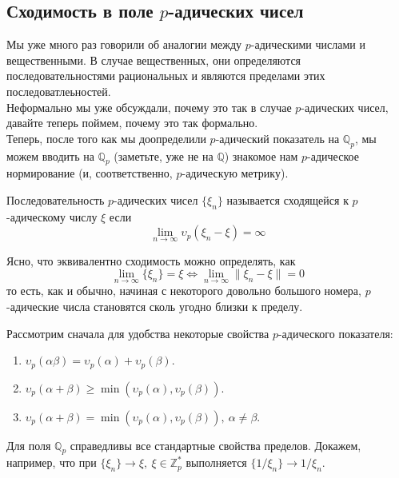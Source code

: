 \documentclass[11pt]{article}
\begin{document}
    \subsection{Сходимость в поле $p$-адических чисел}
    Мы уже много раз говорили об аналогии между $p$-адическими числами и вещественными. В случае вещественных, они определяются последовательностями
    рациональных и являются пределами этих последоватлеьностей. \\

    Неформально мы уже обсуждали, почему это так в случае $p$-адических чисел, давайте теперь поймем, почему это так формально. \\

    Теперь, после того как мы доопределили $p$-адический показатель на $\mathbb{Q}_p$, мы можем вводить на $\mathbb{Q}_p$ (заметьте, уже не на $\mathbb{Q}$) знакомое
    нам  $p$-адическое нормирование (и, соответственно, $p$-адическую метрику).

    \begin{definition}
        Последовательность $p$-адических чисел $\{ \xi_n \}$ называется сходящейся к $p$-адическому числу  $\xi$ если
        \[ \lim\limits_{n \to \infty} \upsilon_p(\xi_n - \xi) = \infty \]
    \end{definition}
    \begin{remark}
        Ясно, что эквивалентно сходимость можно определять, как
        \[ \lim\limits_{n \to \infty} \{ \xi_n \} = \xi \Leftrightarrow \lim\limits_{n \to \infty}\| \xi_n - \xi \| = 0\]
        то есть, как и обычно, начиная с некоторого довольно большого номера, $p$-адические числа становятся сколь угодно близки к пределу.
    \end{remark}
    Рассмотрим сначала для удобства некоторые свойства $p$-адического показателя:
    \begin{enumerate}
        \item $\upsilon_{p}(\alpha \beta) = \upsilon_p(\alpha) + \upsilon_p{(\beta)} $.

        \item $ \upsilon_p{(\alpha + \beta)} \ge \min(\upsilon_p{(\alpha)}, \upsilon_p{(\beta)})$.

        \item $ \upsilon_p{(\alpha + \beta)} = \min{( \upsilon_p{(\alpha)}, \upsilon_p{(\beta)})}, \ \alpha \neq \beta$.
    \end{enumerate}
    Для поля $\mathbb{Q}_p$ справедливы все стандартные свойства пределов. Докажем, например, что при $\{ \xi_n \} \to \xi, \ \xi \in \mathbb{Z}_p^{*}$ выполняется $\{ 1 / \xi_n \} \to 1 / \xi_n$. \\
\end{document}

